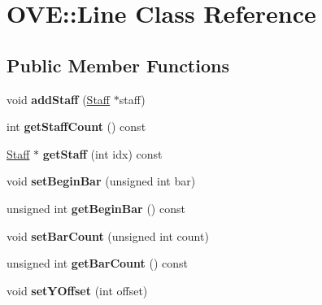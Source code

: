 \hypertarget{class_o_v_e_1_1_line}{}\section{O\+VE\+:\+:Line Class Reference}
\label{class_o_v_e_1_1_line}
\subsection*{Public Member Functions}
\begin{DoxyCompactItemize}
\item 
\mbox{\label{class_o_v_e_1_1_line_addd76c6cd51b9348ef6620db2fea256b}} 
void {\bfseries add\+Staff} (\hyperlink{class_o_v_e_1_1_staff}{Staff} $\ast$staff)
\item 
\mbox{\label{class_o_v_e_1_1_line_a5ba8df5d00c30e0d54b891bf088b38f8}} 
int {\bfseries get\+Staff\+Count} () const
\item 
\mbox{\label{class_o_v_e_1_1_line_a73b3bfe5bebb2c3e5546e1e511507466}} 
\hyperlink{class_o_v_e_1_1_staff}{Staff} $\ast$ {\bfseries get\+Staff} (int idx) const
\item 
\mbox{\label{class_o_v_e_1_1_line_a1febb4f22166aeec80097b86fdb5c914}} 
void {\bfseries set\+Begin\+Bar} (unsigned int bar)
\item 
\mbox{\label{class_o_v_e_1_1_line_a33f5db04323509304859bafbf5c78837}} 
unsigned int {\bfseries get\+Begin\+Bar} () const
\item 
\mbox{\label{class_o_v_e_1_1_line_a75a9b02321e507f05407c48670c61b8a}} 
void {\bfseries set\+Bar\+Count} (unsigned int count)
\item 
\mbox{\label{class_o_v_e_1_1_line_aa6aa9d17f9f915cfc9abbbce3bd0c840}} 
unsigned int {\bfseries get\+Bar\+Count} () const
\item 
\mbox{\label{class_o_v_e_1_1_line_a496358b5321cf0c1affa1561bd6e5f16}} 
void {\bfseries set\+Y\+Offset} (int offset)
\item 
\mbox{\label{class_o_v_e_1_1_line_a90a9c45a5883fd2d4f909d64a549ee50}} 

\end{DoxyCompactItemize}
